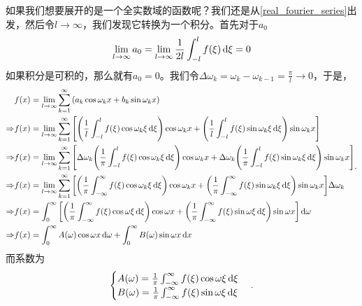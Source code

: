\documentclass[12pt,a4paper,openany,twoside]{book}
\numberwithin{equation}{section}
\begin{document}
        如果我们想要展开的是一个全实数域的函数呢？我们还是从\ref{real_fourier_series}出发，然后令$l\to\infty$，我们发现它转换为一个积分。首先对于$a_0$
        \begin{equation}
          \lim_{l\to\infty}{a_0}=\lim_{l\to\infty}{\frac{1}{2l}\int_{-l}^{l}{f\qty(\xi)\dd{\xi}}}=0
        \end{equation}
        如果积分是可积的，那么就有$a_0=0$。我们令$\Delta\omega_k=\omega_k-\omega_{k-1}=\frac{\pi}{l}\to0$，于是，
        \begin{equation}
          \begin{aligned}
            &f\qty(x)=\lim_{l\to\infty}\sum_{k=1}^{\infty}{\qty(a_k\cos{\omega_k x}+b_k\sin{\omega_k x})}\\
            \Rightarrow&f\qty(x)=\lim_{l\to\infty}{\sum_{k=1}^{\infty}{\qty[\qty(\frac{1}{l}\int_{-l}^l{f\qty(\xi)\cos{\omega_k\xi}\dd{\xi}})\cos{\omega_k x}+\qty(\frac{1}{l}\int_{-l}^l{f\qty(\xi)\sin{\omega_k\xi}\dd{\xi}})\sin{\omega_k x}]}}\\
            \Rightarrow&f\qty(x)=\lim_{l\to\infty}{\sum_{k=1}^{\infty}{\qty[\Delta\omega_k\qty(\frac{1}{\pi}\int_{-l}^l{f\qty(\xi)\cos{\omega_k\xi}\dd{\xi}})\cos{\omega_k x}+\Delta\omega_k\qty(\frac{1}{\pi}\int_{-l}^l{f\qty(\xi)\sin{\omega_k\xi}\dd{\xi}})\sin{\omega_k x}]}}\\
            \Rightarrow&f\qty(x)=\lim_{l\to\infty}{\sum_{k=1}^{\infty}{\qty[\qty(\frac{1}{\pi}\int_{-\infty}^\infty{f\qty(\xi)\cos{\omega_k\xi}\dd{\xi}})\cos{\omega_k x}+\qty(\frac{1}{\pi}\int_{-\infty}^\infty{f\qty(\xi)\sin{\omega_k\xi}\dd{\xi}})\sin{\omega_k x}]\Delta\omega_k}}\\
            \Rightarrow&f\qty(x)=\int_0^\infty{\qty[\qty(\frac{1}{\pi}\int_{-\infty}^\infty{f\qty(\xi)\cos{\omega\xi}\dd{\xi}})\cos{\omega x}+\qty(\frac{1}{\pi}\int_{-\infty}^\infty{f\qty(\xi)\sin{\omega\xi}\dd{\xi}})\sin{\omega x}]\dd{\omega}}\\
            \Rightarrow&f\qty(x)=\int_0^\infty{A\qty(\omega)\cos{\omega x}\dd{\omega}}+\int_0^\infty{B\qty(\omega)\sin{\omega x}\dd{x}}
          \end{aligned}  
          .
        \end{equation}
        而系数为
        \begin{equation}
          \begin{cases}
            A\qty(\omega)=\frac{1}{\pi}\int^\infty_{-\infty}{f\qty(\xi)\cos{\omega\xi}\dd{\xi}}\\
            B\qty(\omega)=\frac{1}{\pi}\int^\infty_{-\infty}{f\qty(\xi)\sin{\omega\xi}\dd{\xi}} 
          \end{cases}
          .
        \end{equation}
\end{document}
